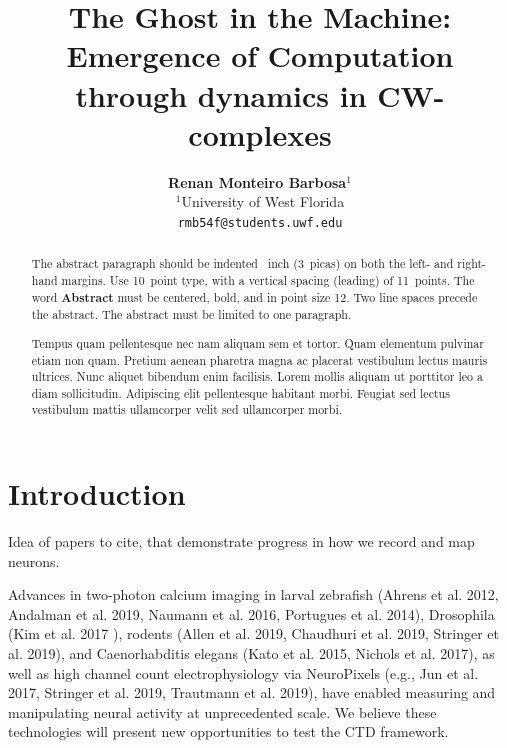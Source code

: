 \documentclass{article}
\title{The Ghost in the Machine: Emergence of Computation through dynamics in CW-complexes}
\author{
  \textbf{Renan Monteiro Barbosa$^{1}$} \\ 
  $^{1}$University of West Florida \\ 
  \texttt{rmb54f@students.uwf.edu}
}
\begin{document}
\maketitle



\begin{abstract}
The abstract paragraph should be indented ~inch (3~picas) on both the left- and right-hand margins. Use 10~point type, with a vertical spacing (leading) of 11~points.  The word \textbf{Abstract} must be centered, bold, and in point size 12. Two line spaces precede the abstract. The abstract must be limited to one paragraph.

Tempus quam pellentesque nec nam aliquam sem et tortor. 
Quam elementum pulvinar etiam non quam. 
Pretium aenean pharetra magna ac placerat vestibulum lectus mauris ultrices. 
Nunc aliquet bibendum enim facilisis. 
Lorem mollis aliquam ut porttitor leo a diam sollicitudin. 
Adipiscing elit pellentesque habitant morbi. 
Feugiat sed lectus vestibulum mattis ullamcorper velit sed ullamcorper morbi.
\end{abstract}


\section{Introduction}

Idea of papers to cite, that demonstrate progress in how we record and map neurons.

Advances in two-photon calcium imaging in larval zebrafish (Ahrens et al. 2012, Andalman et al. 2019, Naumann et al. 2016, Portugues et al. 2014), Drosophila (Kim et al. 2017 \cite{kim2017ring} ), rodents (Allen et al. 2019, Chaudhuri et al. 2019, Stringer et al. 2019), and Caenorhabditis elegans (Kato et al. 2015, Nichols et al. 2017), as well as high channel count electrophysiology via NeuroPixels (e.g., Jun et al. 2017, Stringer et al. 2019, Trautmann et al. 2019), have enabled measuring and manipulating neural activity at unprecedented scale. We believe these technologies will present new opportunities to test the CTD framework.
\end{document}
